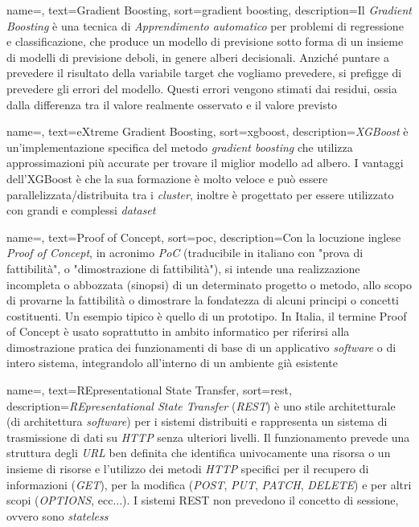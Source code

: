 {
    name=,
    text=Gradient Boosting,
    sort=gradient boosting,
    description={Il \textit{Gradient Boosting} è una tecnica di \textit{\gls{Apprendimento automatico}} per problemi di regressione e classificazione, che produce un modello di previsione sotto forma di un insieme di modelli di previsione deboli, in genere alberi decisionali. Anziché puntare a prevedere il risultato della variabile target che vogliamo prevedere, si prefigge di prevedere gli errori del modello. Questi errori vengono stimati dai residui, ossia dalla differenza tra il valore realmente osservato e il valore previsto}
}

{
    name=,
    text=eXtreme Gradient Boosting,
    sort=xgboost,
    description={\textit{XGBoost} è un’implementazione specifica del metodo \textit{\gls{gradient boosting}} che utilizza approssimazioni più accurate per trovare il miglior modello ad albero. I vantaggi dell'XGBoost è che la sua formazione è molto veloce e può essere parallelizzata/distribuita tra i \textit{\gls{cluster}}, inoltre è progettato per essere utilizzato con grandi e complessi \textit{dataset}}
}

{
    name=,
    text=Proof of Concept,
    sort=poc,
    description={Con la locuzione inglese \textit{Proof of Concept}, in acronimo \textit{PoC} (traducibile in italiano con "prova di fattibilità", o "dimostrazione di fattibilità"), si intende una realizzazione incompleta o abbozzata (sinopsi) di un determinato progetto o metodo, allo scopo di provarne la fattibilità o dimostrare la fondatezza di alcuni principi o concetti costituenti. Un esempio tipico è quello di un prototipo. In Italia, il termine Proof of Concept è usato soprattutto in ambito informatico per riferirsi alla dimostrazione pratica dei funzionamenti di base di un applicativo \textit{software} o di intero sistema, integrandolo all'interno di un ambiente già esistente}
}

{
    name=,
    text=REpresentational State Transfer,
    sort=rest,
    description={\textit{REpresentational State Transfer} (\textit{REST}) è uno stile architetturale (di architettura \textit{software}) per i sistemi distribuiti e rappresenta un sistema di trasmissione di dati su \textit{HTTP} senza ulteriori livelli. Il funzionamento prevede una struttura degli \textit{URL} ben definita che identifica univocamente una risorsa o un insieme di risorse e l'utilizzo dei metodi \textit{HTTP} specifici per il recupero di informazioni (\textit{GET}), per la modifica (\textit{POST}, \textit{PUT}, \textit{PATCH}, \textit{DELETE}) e per altri scopi (\textit{OPTIONS}, ecc...). I sistemi REST non prevedono il concetto di sessione, ovvero sono \textit{\gls{stateless}}}
}

